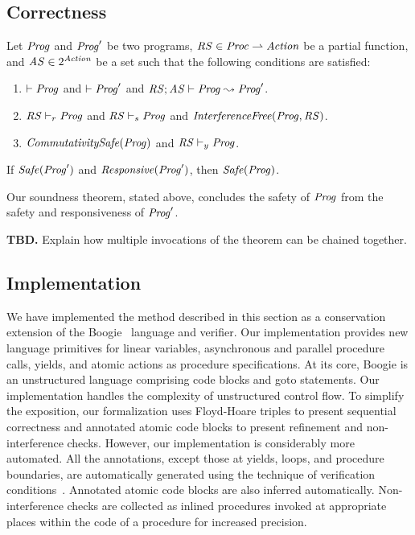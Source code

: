 \subsection{Correctness}
\label{sec:correctness}

\begin{theorem}
Let $\mathit{Prog}$ and $\mathit{Prog}'$ be two programs, $\mathit{RS} \in \mathit{Proc} \rightharpoonup \mathit{Action}$ be a partial function,
and $\mathit{AS} \in 2^{\mathit{Action}}$ be a set such that the following conditions are satisfied:
\begin{enumerate}
\item
$\vdash \mathit{Prog}$ and $\vdash \mathit{Prog}'$ and $\mathit{RS};\mathit{AS} \vdash \mathit{Prog} \leadsto \mathit{Prog}'$.
\item
$\mathit{RS} \vdash_r \mathit{Prog}$ and $\mathit{RS} \vdash_s \mathit{Prog}$ and $\mathit{InterferenceFree}(\mathit{Prog},\mathit{RS})$.
\item
$\mathit{CommutativitySafe}(\mathit{Prog})$ and $\mathit{RS} \vdash_y \mathit{Prog}$.
\end{enumerate}
If $\mathit{Safe}(\mathit{Prog}')$ and $\mathit{Responsive}(\mathit{Prog}')$, then $\mathit{Safe}(\mathit{Prog})$.
\end{theorem}

Our soundness theorem, stated above, concludes the safety of $\mathit{Prog}$ from the safety and responsiveness of $\mathit{Prog}'$.

{\bf TBD.} Explain how multiple invocations of the theorem can be chained together.

\subsection{Implementation}
\label{sec:implementation}

We have implemented the method described in this section as a conservation extension 
of the Boogie~\cite{BarnettCDJL05} language and verifier.
Our implementation provides new language primitives for linear variables, asynchronous and parallel procedure calls, 
yields, and atomic actions as procedure specifications.
At its core, Boogie is an unstructured language comprising code blocks and goto statements.
Our implementation handles the complexity of unstructured control flow.
To simplify the exposition, our formalization uses Floyd-Hoare triples to present sequential correctness and 
annotated atomic code blocks to present refinement and non-interference checks.
However, our implementation is considerably more automated.  
All the annotations, except those at yields, loops, and procedure boundaries, are automatically generated 
using the technique of verification conditions~\cite{BL05}.
Annotated atomic code blocks are also inferred automatically.
Non-interference checks are collected as inlined procedures
invoked at appropriate places within the code of a procedure for increased precision.

